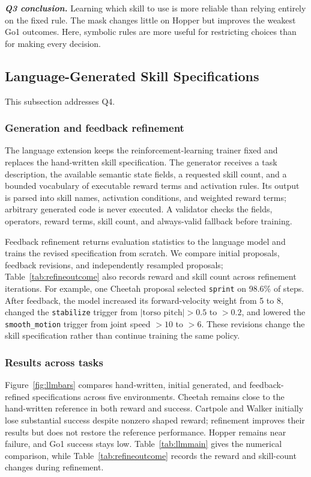 \documentclass[conference,letterpaper,10pt]{IEEEtran}
\begin{document}
\par\noindent\emph{\textbf{Q3 conclusion.}}
Learning which skill to use is more reliable than relying entirely on the fixed rule. The mask changes little on Hopper but improves the weakest Go1 outcomes. Here, symbolic rules are more useful for restricting choices than for making every decision.

\subsection{Language-Generated Skill Specifications}
This subsection addresses Q4.

\subsubsection{Generation and feedback refinement}
The language extension keeps the reinforcement-learning trainer fixed and replaces the hand-written skill specification. The generator receives a task description, the available semantic state fields, a requested skill count, and a bounded vocabulary of executable reward terms and activation rules. Its output is parsed into skill names, activation conditions, and weighted reward terms; arbitrary generated code is never executed. A validator checks the fields, operators, reward terms, skill count, and always-valid fallback before training.

Feedback refinement returns evaluation statistics to the language model and trains the revised specification from scratch. We compare initial proposals, feedback revisions, and independently resampled proposals; Table~\ref{tab:refineoutcome} also records reward and skill count across refinement iterations. For example, one Cheetah proposal selected \texttt{sprint} on 98.6\% of steps. After feedback, the model increased its forward-velocity weight from 5 to 8, changed the \texttt{stabilize} trigger from $|\text{torso pitch}|>0.5$ to $>0.2$, and lowered the \texttt{smooth\_motion} trigger from joint speed $>10$ to $>6$. These revisions change the skill specification rather than continue training the same policy.

\subsubsection{Results across tasks}
Figure~\ref{fig:llmbars} compares hand-written, initial generated, and feedback-refined specifications across five environments. Cheetah remains close to the hand-written reference in both reward and success. Cartpole and Walker initially lose substantial success despite nonzero shaped reward; refinement improves their results but does not restore the reference performance. Hopper remains near failure, and Go1 success stays low. Table~\ref{tab:llmmain} gives the numerical comparison, while Table~\ref{tab:refineoutcome} records the reward and skill-count changes during refinement.
\end{document}
